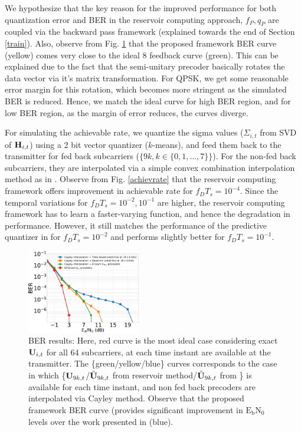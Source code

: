 \documentclass[conference]{IEEEtran}
\begin{document}
We hypothesize that the key reason for the improved performance for both quantization error and BER in the reservoir computing approach, $f_P,q_P$ are coupled via the backward pass framework (explained towards the end of Section \ref{train}). Also, observe from Fig. \ref{BER} that the proposed framework BER curve (yellow) comes very close to the ideal $8$ feedback curve (green). This can be explained due to the fact that the semi-unitary precoder basically rotates the data vector via it's matrix transformation. For QPSK, we get some reasonable error margin for this rotation, which becomes more stringent as the simulated BER is reduced. Hence, we match the ideal curve for high BER region, and for low BER region, as the margin of error reduces, the curves diverge.

\noindent For simulating the achievable rate, we quantize the sigma values ($\Sigma_{i,t}$ from SVD of ${\bf H}_{i,t}$) using a 2 bit vector quantizer ($k$-means), and feed them back to the transmitter for fed back subcarriers ($\{9k, k \in \{0,1,\ldots,7\}\}$). For the non-fed back subcarriers, they are interpolated via a simple convex combination interpolation method as in \cite{Gupt1905:Predictive}. Observe from Fig. \ref{achievrate} that the reservoir computing framework offers improvement in achievable rate for $f_DT_s=10^{-4}$. Since the temporal variations for $f_DT_s=10^{-2}, 10^{-1}$ are higher, the reservoir computing framework has to learn a faster-varying function, and hence the degradation in performance. However, it still matches the performance of the predictive quantizer in \cite{6891198} for $f_DT_s=10^{-2}$ and performs slightly better for $f_DT_s=10^{-1}$.
\vspace{-3pt}

\begin{figure}[h]
\centering
\includegraphics[width=0.44\textwidth]{images/BER_res.pdf}
\caption{BER results: Here, red curve is the most ideal case considering exact ${\bf U}_{i,t}$ for all 64 subcarriers, at each time instant are available at the transmitter. The \{green/yellow/blue\} curves corresponds to the case in which \{${\bf U}_{9k,t}$/$\tilde{{\bf U}}_{9k,t}$ from reservoir method/$\tilde{{\bf U}}_{9k,t}$ from \cite{6891198}\} is available for each time instant, and non fed back precoders are interpolated via Cayley method. Observe that the proposed framework BER curve (provides significant improvement in $\text{E}_\text{b}\text{N}_0$ levels over the work presented in \cite{6891198} (blue).}
\label{BER}
\vspace{-5pt}
\end{figure}
\end{document}
